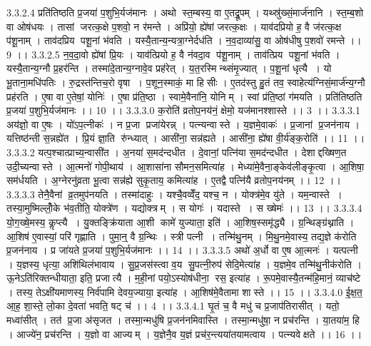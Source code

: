 3.3.2.4
प्रति॑तिष्ठति प्र॒जया॑ प॒शुभि॒र्यज॑मानः । अथो स्त॒म्बस्य॒ वा ए॒तद्रू॒पम् । यथ्स्रु॑ख्सं॒मार्ज॑नानि । स्त॒म्ब॒शो वा ओष॑धयः । तासां जरत्क॒क्षे प॒शवो॒ न र॑मन्ते । अप्रि॑यो॒ ह्ये॑षां जरत्क॒क्षः । याव॑दप्रियो ह॒ वै ज॑रत्क॒क्ष प॑शू॒नाम् । ताव॑दप्रिय पशू॒नां भ॑वति । यस्यै॒तान्य॒न्यत्रा॒ग्नेर्दध॑ति । न॒व॒दाव्या॑सु॒ वा ओष॑धीषु प॒शवो॑ रमन्ते ।। 9 ।।
3.3.2.5
न॒व॒दा॒वो ह्ये॑षां प्रि॒यः । याव॑त्प्रियो ह॒ वै न॑वदा॒व प॑शू॒नाम् । ताव॑त्प्रिय पशू॒नां भ॑वति । यस्यै॒तान्य॒ग्नौ प्र॒हर॑न्ति । तस्मा॑दे॒तान्य॒ग्नावे॒व प्रह॑रेत् । य॒त॒रस्मिन्थ्संमृ॒ज्यात् । प॒शू॒नां धृत्यै । यो भू॒ताना॒मधि॑पतिः । रु॒द्रस्त॑न्तिच॒रो वृषा । प॒शून॒स्माकं॒ मा हि॑सीः । ए॒तद॑स्तु हु॒तं तव॒ स्वाहेत्य॑ग्निसं॒मार्ज॑न्य॒ग्नौ प्रह॑रति । ए॒षा वा ए॒तेषां॒ योनिः॑ । ए॒षा प्र॑ति॒ष्ठा । स्वामे॒वैना॑नि॒ योनिम् । स्वां प्र॑ति॒ष्ठां ग॑मयति । प्रति॑तिष्ठति प्र॒जया॑ प॒शुभि॒र्यज॑मानः ।। 10 ।।
3.3.3.0
क॒रोति॑ व्रतोप॒नय॑नं॒ क्षेमो॒ यज॑मानश्शास्ते ।। 3 ।।
3.3.3.1
अय॑ज्ञो॒ वा ए॒षः । यो॑ऽप॒त्नीकः॑ । न प्र॒जा प्रजा॑येरन्न् । पत्न्यन्वास्ते । य॒ज्ञमे॒वाकः॑ । प्र॒जानां प्र॒जन॑नाय । यत्तिष्ठ॑न्ती स॒न्नह्ये॑त । प्रि॒यं ज्ञा॒ति रु॑न्ध्यात् । आसी॑ना॒ सन्न॑ह्यते । आसी॑ना॒ ह्ये॑षा वी॒र्य॑ङ्क॒रोति॑ ।। 11 ।।
3.3.3.2
यत्प॒श्चात्प्राच्य॒न्वासी॑त । अ॒नया॑ स॒मद॑न्दधीत । दे॒वानां॒ पत्नि॑या स॒मद॑न्दधीत । देशाद्दख्षिण॒त उदी॒च्यन्वास्ते । आ॒त्मनो॑ गोपी॒थाय॑ । आ॒शासा॑ना सौमन॒समित्या॑ह । मेध्या॑मे॒वैना॒ङ्केव॑लीङ्कृ॒त्वा । आ॒शिषा॒ सम॑र्धयति । अ॒ग्नेरनु॑व्रता भू॒त्वा सन्न॑ह्ये सुकृ॒ताय॒ कमित्या॑ह । ए॒तद्वै पत्नि॑यै व्रतोप॒नय॑नम् ।। 12 ।।
3.3.3.3
तेनै॒वैनां व्र॒तमुप॑नयति । तस्मा॑दाहुः । यश्चै॒वव्वेँद॒ यश्च॒ न । योक्त्र॑मे॒व यु॑ते । यम॒न्वास्ते । तस्या॒मुष्मिल्लोँ॒के भ॑व॒तीति॒ योक्त्रे॑ण । यद्योक्त्रम् । स योगः॑ । यदास्ते । स ख्षेमः॑ ।। 13 ।।
3.3.3.4
यो॒ग॒ख्षे॒मस्य॒ कॢप्त्यै । यु॒क्तङ्क्रि॑याता आ॒शी कामे॑ युज्याता॒ इति॑ । आ॒शिष॒स्समृ॑द्ध्यै । ग्र॒न्थिङ्ग्र॑थ्नाति । आ॒शिष॑ ए॒वास्यां॒ परि॑ गृह्णाति । पुमा॒न्॒ वै ग्र॒न्थिः । स्त्री पत्नी । तन्मि॑थु॒नम् । मि॒थु॒नमे॒वास्य॒ तद्य॒ज्ञे क॑रोति प्र॒जन॑नाय । प्र जा॑यते प्र॒जया॑ प॒शुभि॒र्यज॑मानः ।। 14 ।।
3.3.3.5
अथो॑ अ॒र्धो वा ए॒ष आ॒त्मनः॑ । यत्पत्नी । य॒ज्ञस्य॒ धृत्या॒ अशि॑थिलंभावाय । सु॒प्र॒जस॑स्त्वा व॒य सु॒पत्नी॒रुप॑ सेदि॒मेत्या॑ह । य॒ज्ञमे॒व तन्मि॑थु॒नीक॑रोति । ऊ॒नेऽति॑रिक्तन्धीयाता॒ इति॒ प्रजात्यै । म॒ही॒नां पयो॒ऽस्योष॑धीना॒॒ रस॒ इत्या॑ह । रू॒पमे॒वास्यै॒तन्म॑हि॒मानं॒ व्याच॑ष्टे । तस्य॒ तेऽक्षी॑यमाणस्य॒ निर्व॑पामि देवय॒ज्याया॒ इत्या॑ह । आ॒शिष॑मे॒वैतामा शास्ते ।। 15 ।।
3.3.4.0
ई॒क्ष॒त॒ आ॒ह॒ शा॒स्ते॒ लो॒का दे॒वता॑ भवति॒ षट् च॑ ।। 4 ।।
3.3.4.1
घृ॒तं च॒ वै मधु॑ च प्र॒जाप॑तिरासीत् । यतो॒ मध्वा॑सीत् । तत॑ प्र॒जा अ॑सृजत । तस्मा॒न्मधु॑षि प्र॒जन॑नमिवास्ति । तस्मा॒न्मधु॑षा॒ न प्रच॑रन्ति । या॒तया॑म॒ हि । आज्ये॑न॒ प्रच॑रन्ति । य॒ज्ञो वा आज्यम् । य॒ज्ञेनै॒व य॒ज्ञं प्रच॑र॒न्त्यया॑तयामत्वाय । पत्न्यवेक्षते ।। 16 ।।
